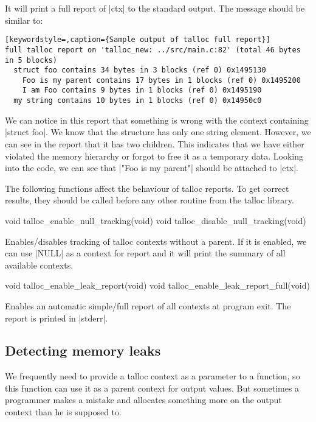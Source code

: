 \noindent
It will print a full report of |ctx| to the standard output. The message should
be similar to:

\begin{lstlisting}[keywordstyle=,caption={Sample output of talloc full report}]
full talloc report on 'talloc_new: ../src/main.c:82' (total 46 bytes in 5 blocks)
  struct foo contains 34 bytes in 3 blocks (ref 0) 0x1495130
    Foo is my parent contains 17 bytes in 1 blocks (ref 0) 0x1495200
    I am Foo contains 9 bytes in 1 blocks (ref 0) 0x1495190
  my string contains 10 bytes in 1 blocks (ref 0) 0x14950c0
\end{lstlisting}

\noindent
We can notice in this report that something is wrong with the context containing
|struct foo|. We know that the structure has only one string element. However,
we can see in the report that it has two children. This indicates that we have
either violated the memory hierarchy or forgot to free it as a temporary data.
Looking into the code, we can see that |"Foo is my parent"| should be attached
to |ctx|.

The following functions affect the behaviour of talloc reports. To get correct
results, they should be called before any other routine from the talloc library.

\begin{funcproto}
void talloc_enable_null_tracking(void)
void talloc_disable_null_tracking(void)
\end{funcproto}
\begin{funcdesc}
Enables/disables tracking of talloc contexts without a parent. If it is enabled,
we can use |NULL| as a context for report and it will print the summary of all
available contexts.
\end{funcdesc}

\begin{funcproto}
void talloc_enable_leak_report(void)
void talloc_enable_leak_report_full(void)
\end{funcproto}
\begin{funcdesc}
  Enables an automatic simple/full report of all contexts at program exit. The
  report is printed in |stderr|.
\end{funcdesc}

\subsection{Detecting memory leaks}

We frequently need to provide a talloc context as a parameter to a function, so
this function can use it as a parent context for output values. But sometimes a
programmer makes a mistake and allocates something more on the output context
than he is supposed to.

